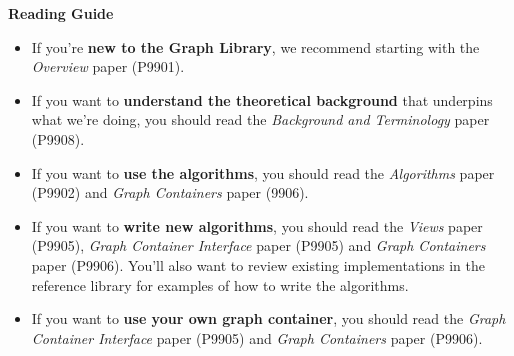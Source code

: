 \textbf{Reading Guide} 
\begin{itemize}
  \item If you're \textbf{new to the Graph Library}, we recommend starting with the \textit{Overview} paper (P9901).
  \item If you want to \textbf{understand the theoretical background} that underpins what we're doing, you should read the \textit{Background and Terminology} paper (P9908).
  \item If you want to \textbf{use the algorithms}, you should read the \textit{Algorithms} paper (P9902) and \textit{Graph Containers} paper (9906).
  \item If you want to \textbf{write new algorithms}, you should read the \textit{Views} paper (P9905), \textit{Graph Container Interface} paper (P9905) and \textit{Graph Containers} paper (P9906).
        You'll also want to review existing implementations in the reference library for examples of how to write the algorithms.
  \item If you want to \textbf{use your own graph container}, you should read the \textit{Graph Container Interface} paper (P9905) and \textit{Graph Containers} paper (P9906).
\end{itemize}

  
%
